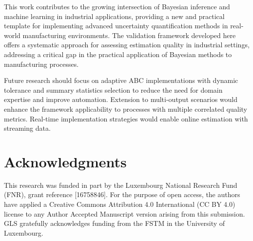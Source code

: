\documentclass{article}
\begin{document}
	This work contributes to the growing intersection of Bayesian inference and machine learning in industrial applications, providing a new and practical template for implementing advanced uncertainty quantification methods in real-world manufacturing environments. The validation framework developed here offers a systematic approach for assessing estimation quality in industrial settings, addressing a critical gap in the practical application of Bayesian methods to manufacturing processes.
	
	Future research should focus on adaptive ABC implementations with dynamic tolerance and summary statistics selection to reduce the need for domain expertise and improve automation. Extension to multi-output scenarios would enhance the framework applicability to processes with multiple correlated quality metrics. Real-time implementation strategies would enable online estimation with streaming data.
	
	
	\section*{Acknowledgments}
	
	This research was funded in part by the Luxembourg National Research Fund (FNR), grant reference [16758846]. For the purpose of open access, the authors have applied a Creative Commons Attribution 4.0 International (CC BY 4.0) license to any Author Accepted Manuscript version arising from this submission. GLS gratefully acknowledges funding from the FSTM in the University of Luxembourg. 
	
	
	 
	
	
\end{document}
